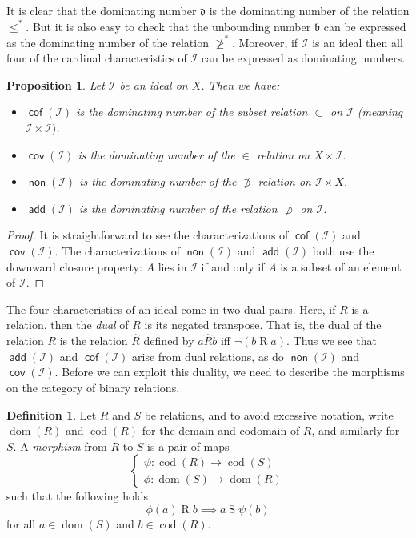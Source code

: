 \documentclass[11pt,oneside,a4paper]{amsbook}
\DeclareMathOperator{\dom}{dom}
\DeclareMathOperator{\cod}{cod}
\DeclareMathOperator{\add}{\mathsf{add}}
\DeclareMathOperator{\non}{\mathsf{non}}
\DeclareMathOperator{\cov}{\mathsf{cov}}
\DeclareMathOperator{\cof}{\mathsf{cof}}
\theoremstyle{definition}
\theoremstyle{plain}
\newtheorem{proposition}[theorem]{Proposition}
\theoremstyle{definition}
\newtheorem{definition}[theorem]{Definition}
\theoremstyle{remark}
\numberwithin{equation}{section}
\numberwithin{figure}{section}
\begin{document}
It is clear that the dominating number $\mathfrak d$ is the dominating number of the relation $\leq^*$. But it is also easy to check that the unbounding number $\mathfrak b$ can be expressed as the dominating number of the relation $\not\geq^*$. Moreover, if $\mathcal I$ is an ideal then all four of the cardinal characteristics of $\mathcal I$ can be expressed as dominating numbers.

\begin{proposition}
  Let $\mathcal I$ be an ideal on $X$. Then we have:
  \begin{itemize}
  \item $\cof(\mathcal I)$ is the dominating number of the subset relation $\subset$ on $\mathcal I$ (meaning $\mathcal I\times\mathcal I)$.
  \item $\cov(\mathcal I)$ is the dominating number of the $\in$ relation on $X\times\mathcal I$.
  \item $\non(\mathcal I)$ is the dominating number of the $\not\ni$ relation on $\mathcal I\times X$.
  \item $\add(\mathcal I)$ is the dominating number of the relation $\not\supset$ on $\mathcal I$.
  \end{itemize}
\end{proposition}

\begin{proof}
  It is straightforward to see the characterizations of $\cof(\mathcal I)$ and $\cov(\mathcal I)$. The characterizations of $\non(\mathcal I)$ and $\add(\mathcal I)$ both use the downward closure property: $A$ lies in $\mathcal I$ if and only if $A$ is a subset of an element of $\mathcal I$.
\end{proof}

The four characteristics of an ideal come in two dual pairs. Here, if $R$ is a relation, then the \emph{dual} of $R$ is its negated transpose. That is, the dual of the relation $R$ is the relation $\hat R$ defined by $a\mathrel{\hat{R}}b$ iff $\neg(b\mathrel Ra)$. Thus we see that $\add(\mathcal I)$ and $\cof(\mathcal I)$ arise from dual relations, as do $\non(\mathcal I)$ and $\cov(\mathcal I)$. Before we can exploit this duality, we need to describe the morphisms on the category of binary relations.

\begin{definition}
  Let $R$ and $S$ be relations, and to avoid excessive notation, write $\dom(R)$ and $\cod(R)$ for the demain and codomain of $R$, and similarly for $S$. A \emph{morphism} from $R$ to $S$ is a pair of maps
\[\begin{cases}\psi\colon\cod(R)\to\cod(S)\\\phi\colon\dom(S)\to\dom(R)\end{cases}
\]
such that the following holds
\[\phi(a)\mathrel{R}b\implies a\mathrel{S}\psi(b)
\]
for all $a\in\dom(S)$ and $b\in\cod(R)$.
\end{definition}
\end{document}
